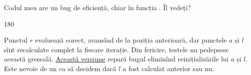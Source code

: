\documentclass[../main.tex]{subfiles}
\begin{document}
Codul meu are un bug de eficiență, chiar în funcția . Îl vedeți?

\begin{turn}{180}
  \begin{minipage}{\linewidth}
    Punctul $r$ evoluează corect, avansînd de la poziția anterioară, dar punctele $a$ și $l$ sînt recalculate complet la fiecare iterație. Din fericire, testele nu pedepsesc această greșeală. \href{https://infoarena.ro/job_detail/3291367?action=view-source}{Această versiune} repară bugul eliminînd reinițializările lui $a$ și $l$. Este nevoie de un  ca să decidem dacă $l$ a fost calculat anterior sau nu.
  \end{minipage}
\end{turn}
\end{document}
